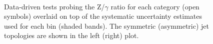 \begin{figure}[h!]
  \begin{center}
    ~~
    \caption{Data-driven tests probing the Z/$\gamma$ ratio for each
      \njet category (open symbols) overlaid on top of the systematic
      uncertainty estimates used for each \scalht bin
      (shaded bands). 
      The symmetric (asymmetric) jet topologies are shown in the left (right) plot.      
    }
    \label{fig:closurePhoToMuMu}
  \end{center} 
\end{figure}

